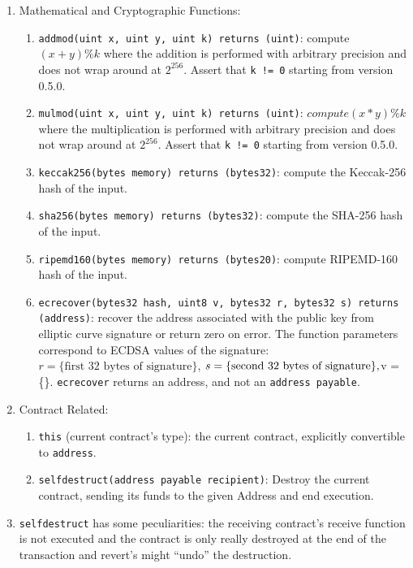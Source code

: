 \begin{enumerate}
\item Mathematical and Cryptographic Functions:
    \begin{enumerate}
    \item\verb|addmod(uint x, uint y, uint k) returns (uint)|: compute $(x + y) \% k$ where the addition is performed with arbitrary precision and does not wrap around at $2^{256}$. Assert that \verb|k != 0| starting from version 0.5.0.
    \item\verb|mulmod(uint x, uint y, uint k) returns (uint)|: $compute (x * y) \% k$ where the multiplication is performed with arbitrary precision and does not wrap around at $2^{256}$. Assert that \verb|k != 0| starting from version 0.5.0.
    \item\verb|keccak256(bytes memory) returns (bytes32)|: compute the Keccak-256 hash of the input.
    \item\verb|sha256(bytes memory) returns (bytes32)|: compute the SHA-256 hash of the input.
    \item\verb|ripemd160(bytes memory) returns (bytes20)|: compute RIPEMD-160 hash of the input.
    \item\verb|ecrecover(bytes32 hash, uint8 v, bytes32 r, bytes32 s) returns (address)|: recover the address associated with the public key from elliptic curve signature or return zero on error. The function parameters correspond to ECDSA values of the signature:\linebreak$r = \{\text{first 32 bytes of signature}\}$, $s = \{\text{second 32 bytes of signature}\},\linebreak$v = \{\}. \verb|ecrecover| returns an address, and not an \verb|address payable|.
    \end{enumerate}

\item Contract Related:
    \begin{enumerate}
    \item\verb|this| (current contract’s type): the current contract, explicitly convertible to \verb|address|.
    \item\verb|selfdestruct(address payable recipient)|: Destroy the current contract, sending its funds to the given Address and end execution.
    \end{enumerate}

\item\verb|selfdestruct| has some peculiarities: the receiving contract’s receive function is not executed and the contract is only really destroyed at the end of the transaction and revert’s might “undo” the destruction.


\end{enumerate}
